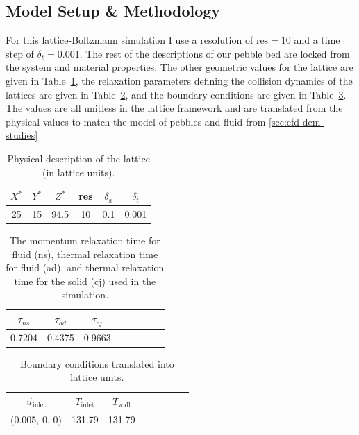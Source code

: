 \subsection{Model Setup \& Methodology}

For this lattice-Boltzmann simulation I use a resolution of $\text{res} = 10$ and a time step of $\delta_t = $\num{0.001}. The rest of the descriptions of our pebble bed are locked from the system and material properties. The other geometric values for the lattice are given in Table~\ref{tab:lbm-parameters}, the relaxation parameters defining the collision dynamics of the lattices are given in Table~\ref{tab:lbm-relaxations}, and the boundary conditions are given in Table~\ref{tab:lbm-boundaries}. The values are all unitless in the lattice framework and are translated from the physical values to match the model of pebbles and fluid from \cref{sec:cfd-dem-studies}

\begin {table}[htp] %
\caption{Physical description of the lattice (in lattice units).}
\label{tab:lbm-parameters} \centering %
\begin {tabular}{ cccccc }
\toprule %
$X^*$   &   $Y^*$  &   $Z^*$    &   res  & $\delta_x$   & $\delta_t$    \\\toprule
25      &   15     &   94.5     &   10   &  0.1         &  0.001        \\\bottomrule
\end{tabular}
\end{table}

\begin {table}[htp] %
\caption{The momentum relaxation time for fluid (ns), thermal relaxation time for fluid (ad), and thermal relaxation time for the solid (cj) used in the simulation.}
\label{tab:lbm-relaxations} \centering %
\begin {tabular}{ cccccccc }
\toprule %
$\tau_{ns}$ &  $\tau_{ad}$  &   $\tau_{cj}$     \\\toprule
0.7204      &  0.4375       &   0.9663          \\\bottomrule
\end{tabular}
\end{table}

\begin {table}[htp] %
\caption{Boundary conditions translated into lattice units.}
\label{tab:lbm-boundaries} \centering %
\begin {tabular}{ cccccccc }
\toprule %
$\vec{u}_\text{inlet}$    &  $T_\text{inlet}$   &  $T_\text{wall}$     \\\toprule
(0.005, 0, 0)           &  131.79           &   131.79          \\\bottomrule
\end{tabular}
\end{table}


